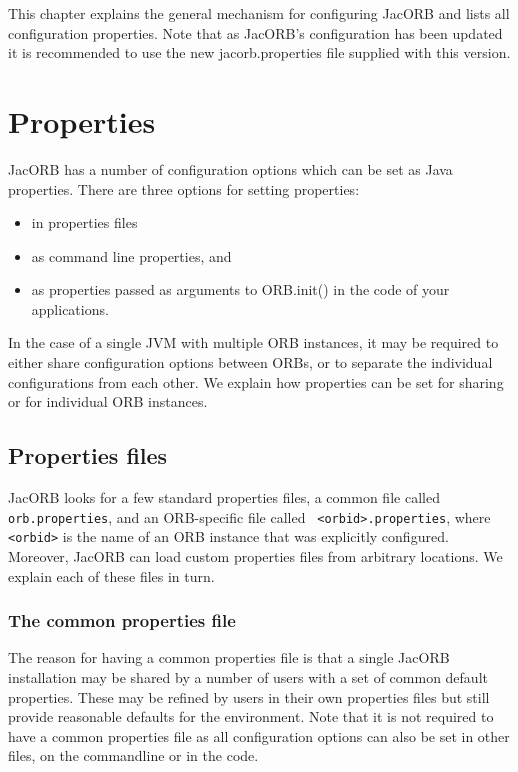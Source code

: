 %
%

This chapter explains the general mechanism for configuring JacORB
and lists all configuration properties. Note that as JacORB's
configuration has been updated it is recommended to use the new
jacorb.properties file supplied with this version.

\section{Properties}

JacORB has a number of configuration options which can be set as Java
properties. There are three options for setting properties:

\begin{itemize}
\item in properties files
\item as command line properties, and
\item as properties passed as arguments to ORB.init() in the code of your
  applications.
\end{itemize}

In the case of a single JVM with multiple ORB instances, it may be
required to either share configuration options between ORBs, or to
separate the individual configurations from each other. We explain how
properties can be set for sharing or for individual ORB instances.

\subsection{Properties files}

JacORB looks for a few standard properties files, a common file called
{\tt orb.properties}, and an ORB-specific file called {\tt
  <orbid>.properties}, where {\tt <orbid>} is the name of an ORB
instance that was explicitly configured. Moreover, JacORB can load
custom properties files from arbitrary locations. We explain each of
these files in turn.

\subsubsection{The common properties file}

The reason for having a common properties file is that a single JacORB
installation may be shared by a number of users with a set of common
default properties. These may be refined by users in their own
properties files but still provide reasonable defaults for the
environment. Note that it is not required to have a common properties
file as all configuration options can also be set in other files, on
the commandline or in the code.

